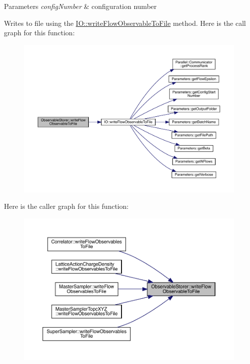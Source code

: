 \begin{DoxyParams}{Parameters}
{\em config\+Number} & configuration number\\
\hline
\end{DoxyParams}
Writes to file using the \mbox{\hyperlink{namespace_i_o_a4f554804fd2ccd9c13c73777c5cbbf77}{I\+O\+::write\+Flow\+Observable\+To\+File}} method. Here is the call graph for this function\+:
\nopagebreak
\begin{figure}[H]
\begin{center}
\leavevmode
\includegraphics[width=350pt]{class_observable_storer_af51ebd65eae2a5087cfd47ddf230da93_cgraph}
\end{center}
\end{figure}
Here is the caller graph for this function\+:
\nopagebreak
\begin{figure}[H]
\begin{center}
\leavevmode
\includegraphics[width=350pt]{class_observable_storer_af51ebd65eae2a5087cfd47ddf230da93_icgraph}
\end{center}
\end{figure}
\mbox{\label{class_observable_storer_a146f9acb8a0a2ce15782d26bdc4f0bf9}} 

